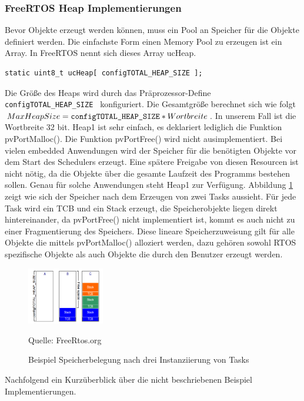 \documentclass[ngerman]{seminarvorlage}
\newcommand*{\quelle}{%
  \footnotesize Quelle: 
}
\begin{document}
\subsubsection{FreeRTOS Heap Implementierungen}
Bevor Objekte erzeugt werden können, muss ein Pool an Speicher für die Objekte definiert werden. Die einfachste Form einen Memory Pool zu erzeugen ist ein Array. In FreeRTOS nennt sich dieses Array ucHeap. 
\begin{lstlisting}[label=lst:ucHeap, float=hbt, numbers = none]
static uint8_t ucHeap[ configTOTAL_HEAP_SIZE ];
\end{lstlisting}
\newline
Die Größe des Heaps wird durch das Präprozessor-Define \verb|configTOTAL_HEAP_SIZE | konfiguriert. Die Gesamtgröße berechnet sich wie folgt
\newline
$MaxHeapSize = \verb|configTOTAL_HEAP_SIZE| \ast Wortbreite$. 
\newline
In unserem Fall ist die Wortbreite 32 bit. Heap1 ist sehr einfach, es deklariert lediglich die Funktion pvPortMalloc(). Die Funktion pvPortFree() wird nicht ausimplementiert. Bei vielen embedded Anwendungen wird der Speicher für die benötigten Objekte vor dem Start des Schedulers erzeugt. Eine spätere Freigabe von diesen Resourcen ist nicht nötig, da die Objekte über die gesamte Laufzeit des Programms bestehen sollen. Genau für solche Anwendungen steht Heap1 zur Verfügung. Abbildung \ref{fig:Heap1} zeigt wie sich der Speicher nach dem Erzeugen von zwei Tasks aussieht. Für jede Task wird ein TCB und ein Stack erzeugt, die Speicherobjekte liegen direkt hintereinander, da pvPortFree() nicht implementiert ist, kommt es auch nicht zu einer Fragmentierung des Speichers. Diese lineare Speicherzuweisung gilt für alle Objekte die mittels pvPortMalloc() alloziert werden, dazu gehören sowohl RTOS spezifische Objekte als auch Objekte die durch den Benutzer erzeugt werden. 

\begin{figure}[ht!]
	\centering
		\includegraphics[width=0.3\textwidth]{Pictures/FreeRtosOrg/heap1Alg.png}
	\caption{Beispiel Speicherbelegung nach drei Instanziierung von Tasks}
	\quelle{FreeRtos.org}
	\label{fig:Heap1}
\end{figure}
Nachfolgend ein Kurzüberblick über die nicht beschriebenen Beispiel Implementierungen.  
\end{document}
